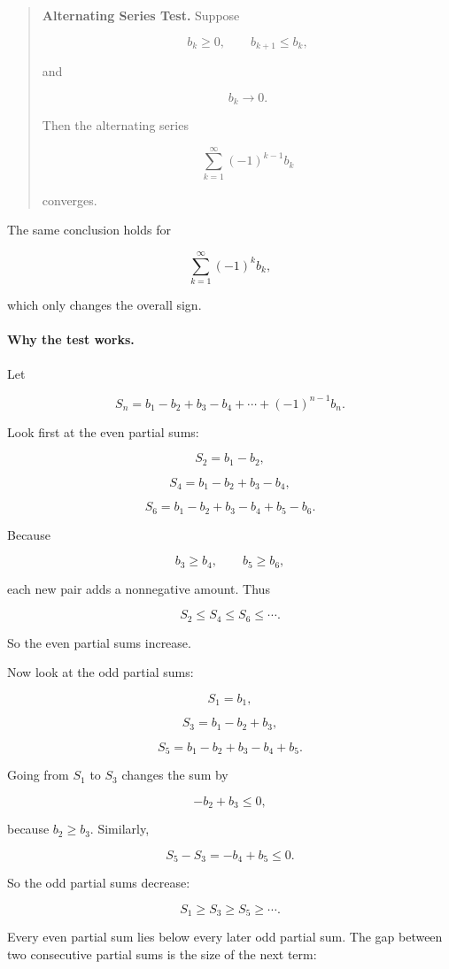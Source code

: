 \begin{quote}
\textbf{Alternating Series Test.}
Suppose

\[
b_k\ge0,
\qquad
b_{k+1}\le b_k,
\]

and

\[
b_k\to0.
\]

Then the alternating series

\[
\boxed{
\sum_{k=1}^{\infty}(-1)^{k-1}b_k
}
\]

converges.
\end{quote}

The same conclusion holds for

\[
\sum_{k=1}^{\infty}(-1)^k b_k,
\]

which only changes the overall sign.

\paragraph{Why the test works.}
Let

\[
S_n=b_1-b_2+b_3-b_4+\cdots+(-1)^{n-1}b_n.
\]

Look first at the even partial sums:

\[
S_2=b_1-b_2,
\]

\[
S_4=b_1-b_2+b_3-b_4,
\]

\[
S_6=b_1-b_2+b_3-b_4+b_5-b_6.
\]

Because

\[
b_3\ge b_4,
\qquad
b_5\ge b_6,
\]

each new pair adds a nonnegative amount.  Thus

\[
S_2\le S_4\le S_6\le\cdots.
\]

So the even partial sums increase.

Now look at the odd partial sums:

\[
S_1=b_1,
\]

\[
S_3=b_1-b_2+b_3,
\]

\[
S_5=b_1-b_2+b_3-b_4+b_5.
\]

Going from \(S_1\) to \(S_3\) changes the sum by

\[
-b_2+b_3\le0,
\]

because \(b_2\ge b_3\).  Similarly,

\[
S_5-S_3=-b_4+b_5\le0.
\]

So the odd partial sums decrease:

\[
S_1\ge S_3\ge S_5\ge\cdots.
\]

Every even partial sum lies below every later odd partial sum.  The gap between two
consecutive partial sums is the size of the next term:

